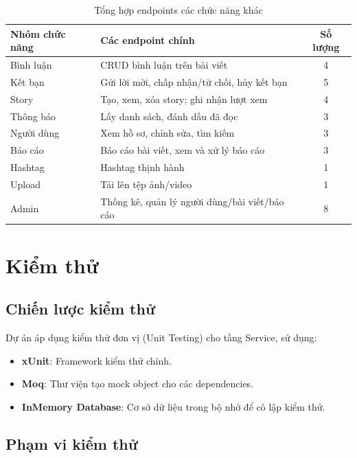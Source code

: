 \documentclass[a4paper]{article}
\begin{document}
\begin{table}[h!]
\centering
\caption{Tổng hợp endpoints các chức năng khác}
\begin{tabularx}{\textwidth}{|l|X|c|}
\hline
\textbf{Nhóm chức năng} & \textbf{Các endpoint chính} & \textbf{Số lượng} \\
\hline
Bình luận & CRUD bình luận trên bài viết & 4 \\
\hline
Kết bạn & Gửi lời mời, chấp nhận/từ chối, hủy kết bạn & 5 \\
\hline
Story & Tạo, xem, xóa story; ghi nhận lượt xem & 4 \\
\hline
Thông báo & Lấy danh sách, đánh dấu đã đọc & 3 \\
\hline
Người dùng & Xem hồ sơ, chỉnh sửa, tìm kiếm & 3 \\
\hline
Báo cáo & Báo cáo bài viết, xem và xử lý báo cáo & 3 \\
\hline
Hashtag & Hashtag thịnh hành & 1 \\
\hline
Upload & Tải lên tệp ảnh/video & 1 \\
\hline
Admin & Thống kê, quản lý người dùng/bài viết/báo cáo & 8 \\
\hline
\end{tabularx}
\end{table}

\newpage

\section{Kiểm thử}

\subsection{Chiến lược kiểm thử}

Dự án áp dụng kiểm thử đơn vị (Unit Testing) cho tầng Service, sử dụng:
\begin{itemize}
    \item \textbf{xUnit}: Framework kiểm thử chính.
    \item \textbf{Moq}: Thư viện tạo mock object cho các dependencies.
    \item \textbf{InMemory Database}: Cơ sở dữ liệu trong bộ nhớ để cô lập kiểm thử.
\end{itemize}

\subsection{Phạm vi kiểm thử}
\end{document}
